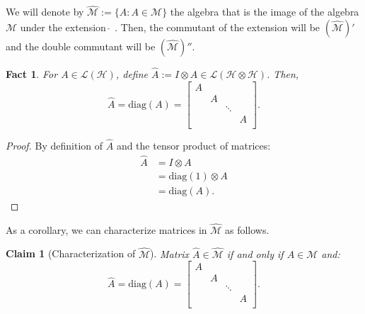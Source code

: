 \documentclass[12pt]{article}
\theoremstyle{plain}
\newtheorem{claim}[theorem]{Claim}
\newtheorem{fact}[theorem]{Fact}
\begin{document}
We will denote by $\widehat{\mathcal{M}} := \{\widehat{A}: A \in \mathcal{M}\}$ the algebra that is the image of the algebra $\mathcal{M}$ under the extension $\widehat{\: }$ . Then, the commutant of the extension will be $(\widehat{\mathcal{M}})'$ and the double commutant will be $(\widehat{\mathcal{M}})''$.

\begin{fact}
\label{fact-A-diag}
    For $A \in \mathcal{L}(\mathcal{H})$, define $\widehat{A} := I \otimes A \in \mathcal{L}(\mathcal{H} \otimes \mathcal{H})$. Then,
    \begin{equation}
        \widehat{A} = \text{diag}(A) = 
    \begin{bmatrix}
    A & \\
    & A \\
    & & \ddots\\
    & & & A\\
    \end{bmatrix}.
    \end{equation}
\end{fact}
\begin{proof}
    By definition of $\widehat{A}$ and the tensor product of matrices:
    \begin{align*}
        \widehat{A} &= I \otimes A\\
        &= \text{diag}(1) \otimes A \\
        &= \text{diag}(A).
    \end{align*}
\end{proof}
\noindent As a corollary, we can characterize matrices in $\widehat{\mathcal{M}}$ as follows.

\begin{claim}[Characterization of $\widehat{\mathcal{M}}$]\label{claim-m-hat}
    Matrix $\widehat{A} \in \widehat{\mathcal{M}}$ if and only if $A \in \mathcal{M}$ and:
    \begin{equation}
        \widehat{A} = \text{diag}(A) = 
    \begin{bmatrix}
    A & \\
    & A \\
    & & \ddots\\
    & & & A\\
    \end{bmatrix}.
    \end{equation}
\end{claim}
\end{document}

